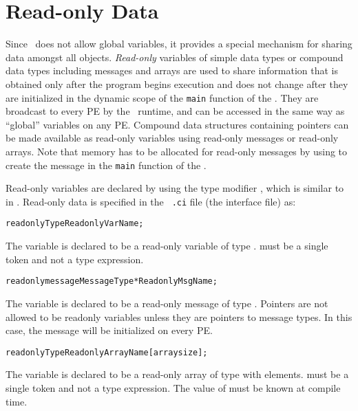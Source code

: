 \section{Read-only Data}
\label{readonly}

Since \charmpp\ does not allow global variables,
it provides a special mechanism for sharing
data amongst all objects. {\it Read-only} variables of simple data types or
compound data types including messages and arrays are used to share information
that is obtained only after the program begins execution and does not change
after they are initialized in the dynamic scope of the {\tt main} function of
the . They are broadcast to every PE by the \charmpp\ runtime,
and can be accessed in the same way as \CC ``global'' variables on any PE.
Compound data structures containing pointers can be made available as read-only
variables using read-only messages or read-only arrays.  Note that memory
has to be allocated for read-only messages by using  to create the
message in the {\tt main} function of the . 

Read-only variables are declared by using the type modifier ,
which is similar to  in \CC. Read-only data is specified in the {\tt
.ci} file (the interface file) as: 

\begin{alltt}
 readonly Type ReadonlyVarName;
\end{alltt}

The variable  is declared to be a read-only variable of
type .  must be a single token and not a type expression.

\begin{alltt}
 readonly message MessageType *ReadonlyMsgName;
\end{alltt}

The variable  is declared to be a read-only message of type
. Pointers are not allowed to be readonly variables unless they
are pointers to message types. In this case, the message will be initialized on
every PE.

\begin{alltt}
 readonly Type ReadonlyArrayName [arraysize];
\end{alltt}

The variable  is declared to be a read-only array of type
 with  elements.  must be a single token and
not a type expression. The value of  must be known at compile
time.

